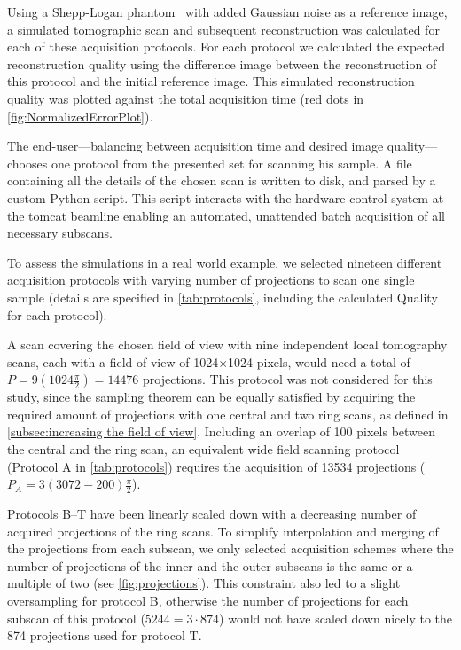 Using a Shepp-Logan phantom~\cite{Shepp1974} with added Gaussian noise as a reference image, a simulated tomographic scan and subsequent reconstruction was calculated for each of these acquisition protocols. For each protocol we calculated the expected reconstruction quality using the difference image between the reconstruction of this protocol and the initial reference image. This simulated reconstruction quality was plotted against the total acquisition time (red dots in \autoref{fig:NormalizedErrorPlot}).

The end-user---balancing between acquisition time and desired image quality---chooses one protocol from the presented set for scanning his sample. A file containing all the details of the chosen scan is written to disk, and parsed by a custom Python-script. This script interacts with the hardware control system at the \ac{tomcat} beamline enabling an automated, unattended batch acquisition of all necessary subscans.

To assess the simulations in a real world example, we selected nineteen different acquisition protocols with varying number of projections to scan one single sample (details are specified in \autoref{tab:protocols}, including the calculated Quality for each protocol).

A scan covering the chosen field of view with nine independent local tomography scans, each with a field of view of 1024$\times$1024 pixels, would need a total of $P=9(1024\frac{\pi}{2})=14476$ projections. This protocol was not considered for this study, since the sampling theorem can be equally satisfied by acquiring the required amount of projections with one central and two ring scans, as defined in \autoref{subsec:increasing the field of view}. Including an overlap of 100 pixels between the central and the ring scan, an equivalent wide field scanning protocol (Protocol A in \autoref{tab:protocols}) requires the acquisition of 13534 projections ($P_{A}=3(3072-200)\frac{\pi}{2}$).

Protocols B--T have been linearly scaled down with a decreasing number of acquired projections of the ring scans. To simplify interpolation and merging of the projections from each subscan, we only selected acquisition schemes where the number of projections of the inner and the outer subscans is the same or a multiple of two (see \autoref{fig:projections}). This constraint also led to a slight oversampling for protocol B, otherwise the number of projections for each subscan of this protocol ($5244=3\cdot874$) would not have scaled down nicely to the 874 projections used for protocol T.

